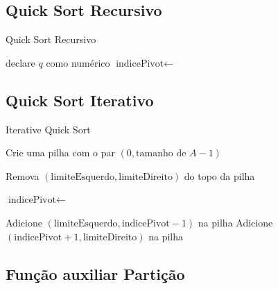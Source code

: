 \subsection{Quick Sort Recursivo}

\begin{algorithm}
	\caption{Quick Sort Recursivo}
	\label{algo:rec_quick_sort}
	\begin{algorithmic}[1]
		\State declare $q$ como numérico
		\State $\text{indicePivot} \gets$ 
		\State {}
		\State {}
		\EndIf
		\Statex
		\EndFunction
	\end{algorithmic}
\end{algorithm}
\FloatBarrier

\subsection{Quick Sort Iterativo}

\begin{algorithm}
	\caption{Iterative Quick Sort}
	\label{algo:iterative_quick_sort}
	\begin{algorithmic}[1]
		\Statex

		\State \Return
		\EndIf
		\State Crie uma pilha com o par $(0, \text{tamanho de } A - 1)$

		\State Remova $(\text{limiteEsquerdo}, \text{limiteDireito})$ do topo da pilha

		\State $\text{indicePivot} \gets$ 

		\State Adicione $(\text{limiteEsquerdo}, \text{indicePivot} - 1)$ na pilha 
		\EndIf
		\State Adicione $(\text{indicePivot} + 1, \text{limiteDireito})$ na pilha 
		\EndIf
		\EndWhile
		\EndFunction
	\end{algorithmic}
\end{algorithm}
\FloatBarrier
\newpage

\subsection{Função auxiliar Partição}

